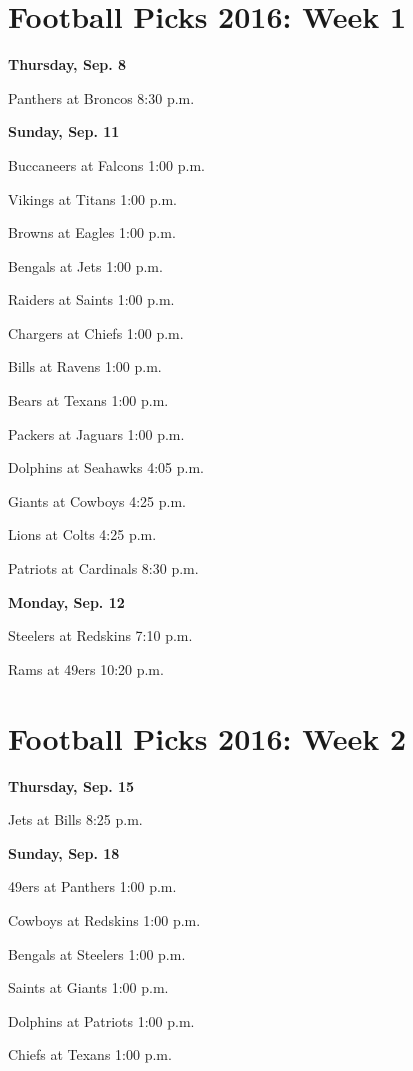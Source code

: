 \documentclass[12pt, letterpaper]{article}
\begin{document}
\setlength{\parindent}{2em}
\setlength{\parskip}{0.75em}

\newpage \section*{\Huge Football Picks 2016: Week 1}
\noindent \Large \textbf{Thursday, Sep. 8} \par
Panthers at Broncos 8:30 p.m.\par
\noindent \Large \textbf{Sunday, Sep. 11} \par
Buccaneers at Falcons 1:00 p.m.\par
Vikings at Titans 1:00 p.m.\par
Browns at Eagles 1:00 p.m.\par
Bengals at Jets 1:00 p.m.\par
Raiders at Saints 1:00 p.m.\par
Chargers at Chiefs 1:00 p.m.\par
Bills at Ravens 1:00 p.m.\par
Bears at Texans 1:00 p.m.\par
Packers at Jaguars 1:00 p.m.\par
Dolphins at Seahawks 4:05 p.m.\par
Giants at Cowboys 4:25 p.m.\par
Lions at Colts 4:25 p.m.\par
Patriots at Cardinals 8:30 p.m.\par
\noindent \Large \textbf{Monday, Sep. 12} \par
Steelers at Redskins 7:10 p.m.\par
Rams at 49ers 10:20 p.m.\par
\newpage \section*{\Huge Football Picks 2016: Week 2}
\noindent \Large \textbf{Thursday, Sep. 15} \par
Jets at Bills 8:25 p.m.\par
\noindent \Large \textbf{Sunday, Sep. 18} \par
49ers at Panthers 1:00 p.m.\par
Cowboys at Redskins 1:00 p.m.\par
Bengals at Steelers 1:00 p.m.\par
Saints at Giants 1:00 p.m.\par
Dolphins at Patriots 1:00 p.m.\par
Chiefs at Texans 1:00 p.m.\par
\end{document}
